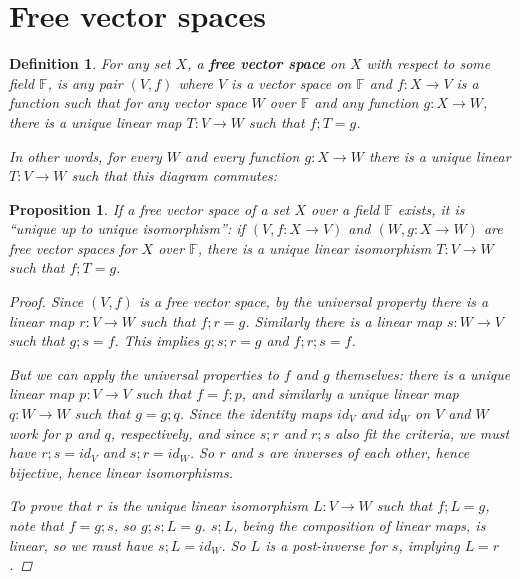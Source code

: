 \documentclass[a4paper,14pt]{article}
\newtheorem*{prop}{Proposition}
\newtheorem*{defn}{Definition}
\begin{document}
\section{Free vector spaces}
\begin{defn}
For any set $X$, a \textbf{free vector space} on $X$ with respect to some field $\mathbb{F}$, is any pair $(V, f)$ where $V$ is a vector space on $\mathbb{F}$ and $f: X \to V$ is a function such that for any vector space $W$ over $\mathbb{F}$ and any function $g: X \to W$, there is a unique linear map $T: V \to W$ such that $f;T = g$.

In other words, for every $W$ and every function $g: X \to W$ there is a unique linear $T: V \to W$ such that this diagram commutes:

\begin{center}
\end{center}
\end{defn}

\begin{prop}
    If a free vector space of a set $X$ over a field $\mathbb{F}$ exists, it is ``unique up to unique isomorphism'': if $(V, f: X \to V)$ and $(W, g: X \to W)$ are free vector spaces for $X$ over $\mathbb{F}$, there is a unique linear isomorphism $T: V \to W$ such that $f;T = g$.

\begin{proof}
    Since $(V, f)$ is a free vector space, by the universal property there is a linear map $r: V \to W$ such that $f;r = g$. Similarly there is a linear map $s: W \to V$ such that $g;s = f$. This implies $g;s;r = g$ and $f;r;s = f$.

\begin{center}
\end{center}

 But we can apply the universal properties to $f$ and $g$ themselves: there is a unique linear map $p: V \to V$ such that $f = f;p$, and similarly a unique linear map $q: W \to W$ such that $g = g;q$. Since the identity maps $id_V$ and $id_W$ on $V$ and $W$ work for $p$ and $q$, respectively, and since $s;r$ and $r;s$ also fit the criteria, we must have $r;s = id_V$ and $s;r = id_W$. So $r$ and $s$ are inverses of each other, hence bijective, hence linear isomorphisms.

To prove that $r$ is the unique linear isomorphism $L: V \to W$ such that $f;L = g$, note that $f = g;s$, so $g;s;L = g$. $s;L$, being the composition of linear maps, is linear, so we must have $s;L = id_W$. So $L$ is a post-inverse for $s$, implying $L = r$.
\end{proof}
\end{prop}
\end{document}
